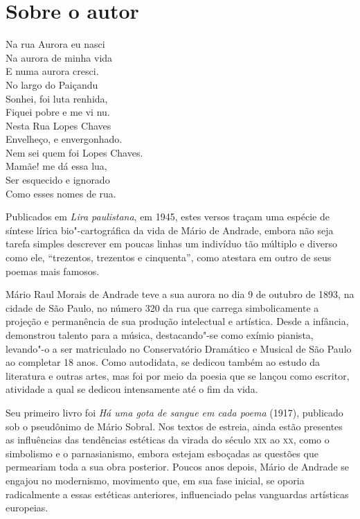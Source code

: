 \chapter{Sobre o autor}

\epigraph{Na rua Aurora eu nasci\\
Na aurora de minha vida\\
E numa aurora cresci.\\[5pt]
No largo do Paiçandu\\
Sonhei, foi luta renhida,\\
Fiquei pobre e me vi nu.\\[5pt]
Nesta Rua Lopes Chaves\\
Envelheço, e envergonhado.\\
Nem sei quem foi Lopes Chaves.\\[5pt]
Mamãe! me dá essa lua,\\
Ser esquecido e ignorado\\
Como esses nomes de rua.}{}

Publicados em
\emph{Lira paulistana}, em 1945, estes versos traçam uma espécie de
síntese lírica bio"-cartográfica da vida de Mário de Andrade, embora não
seja tarefa simples descrever em poucas linhas um indivíduo tão múltiplo
e diverso como ele, ``trezentos, trezentos e cinquenta'', como atestara
em outro de seus poemas mais famosos.

Mário Raul Morais de Andrade teve a sua aurora no dia 9 de outubro de
1893, na cidade de São Paulo, no número 320 da rua que carrega
simbolicamente a projeção e permanência de sua produção intelectual e
artística. Desde a infância, demonstrou talento para a música,
destacando"-se como exímio pianista, levando"-o a ser matriculado no
Conservatório Dramático e Musical de São Paulo ao completar 18 anos.
Como autodidata, se dedicou também ao estudo da literatura e outras
artes, mas foi por meio da poesia que se lançou como escritor, atividade
a qual se dedicou intensamente até o fim da vida.

Seu primeiro livro foi \emph{Há uma gota de sangue em cada poema}
(1917), publicado sob o pseudônimo de Mário Sobral. Nos textos de
estreia, ainda estão presentes as influências das tendências estéticas
da virada do século \textsc{xix} ao \textsc{xx}, como o simbolismo e o parnasianismo,
embora estejam esboçadas as questões que permeariam toda a sua obra
posterior. Poucos anos depois, Mário de Andrade se engajou no
modernismo, movimento que, em sua fase inicial, se oporia radicalmente a
essas estéticas anteriores, influenciado pelas vanguardas artísticas
europeias.

